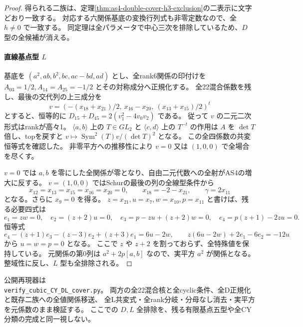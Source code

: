 \begin{proof}
得られる二族は、定理\ref{thm:as4-double-cover-h3-exclusion}の二表示に文字どおり一致する。
対応する六関係基底の変換行列式も非零定数なので、全 $h\ne0$ で一致する。
同定理は全パラメータで中心三次を排除しているため、$D$ 型の全候補が消える。

\paragraph{直線基点型 $L$}
基底を $(a^2,ab,b^2,bc,ac-bd,ad)$ とし、全rank6関係の印付けを
$A_{03}=1/2,A_{14}=A_{25}=-1/2$ とその対称成分へ正規化する。
全22混合係数を残し、最後の交代列の上三成分を
\[
 v=\left(-(x_{18}+x_{21})/2,\ x_{16}-x_{20},\ (x_{13}+x_{15})/2\right)^t
\]
とすると、恒等的に $D_{15}+D_{45}=2(v_1^2-4v_0v_2)$ である。
従って $v$ の二元二次形式はrankが高々1。
$\langle a,b\rangle$ 上の $T\in GL_2$ と $\langle c,d\rangle$ 上の $T^{-t}$ の作用は
$A$ を $\det T$ 倍し、topを戻すと $v\mapsto\operatorname{Sym}^2(T)v/(\det T)^2$ となる。
この全四係数の共変恒等式を確認した。
非零平方への推移性により $v=0$ 又は $(1,0,0)$ で全場合を尽くす。

$v=0$ では $a,b$ を零にした全関係が零となり、自由二元代数への全射がAS4の増大に反する。
$v=(1,0,0)$ ではSchurの最後の列の全線型条件から
\[
 x_{12}=x_{13}=x_{15}=x_{16}=x_{20}=0,\qquad
 x_{18}=-2-x_{21},\qquad \gamma=2x_{11}
\]
となる。さらに $x_9=0$ を得る。
$z=x_{21},u=x_7,w=x_{10},p=x_{11}$ と書けば、残る必要四式は
\[
 e_1=zw=0,\quad e_2=(z+2)u=0,\quad
 e_3=p-zu+(z+2)w=0,\quad e_4=p(z+1)-2zu=0.
\]
恒等式
\[
 e_4-(z+1)e_3-(z-3)e_2+(z+3)e_1=6u-2w,\qquad
 z(6u-2w)+2e_1-6e_2=-12u
\]
から $u=w=p=0$ となる。
ここで $z$ や $z+2$ を割っておらず、全特殊値を保持している。
元関係の第0列は $a^2+2p[a,b]$ なので、実平方 $a^2$ が関係となる。
整域性に反し、$L$ 型も全排除される。
\end{proof}

公開再現器は\\
\texttt{verify\_cubic\_CY\_DL\_cover.py}。
両方の全22混合核と全cyclic条件、全D正規化と既存二族への全値関係移送、
全L共変式・全rank分岐・分母なし消去・実平方を元係数のまま検証する。
ここでの $D,L$ 全排除を、残る有限基点五型や全CY分類の完成と同一視しない。
